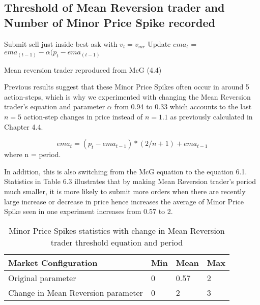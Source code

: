 \subsection{Threshold of Mean Reversion trader and Number of Minor Price Spike recorded}

\begin{algorithm}[H]
\DontPrintSemicolon 
{} {
     {
    Submit sell just inside best ask with $v_t = v_{mr}$\;
    }
    \EndIf
  }
\EndIf
Update $ema_t$ = $ema_{(t-1)} - \alpha(p_t - ema_{(t-1)}$
\caption{{\sc Mean reversion trader reproduced from McG (4.4) \cite{McGroarty}} }
\label{algo:max}
\end{algorithm}

Previous results suggest that these Minor Price Spikes often occur in around 5 action-steps, which is why we experimented with changing the Mean Reversion trader's equation and parameter $\alpha$ from 0.94 to 0.33 which accounts to the last $n = 5$ action-step changes in price instead of $n = 1.1$ as previously calculated in Chapter 4.4.

\begin{equation}
ema_t = (p_{t} - ema_{t-1}) * (2 / n + 1) + ema_{t-1} 
\end{equation}
where n = period.

In addition, this is also switching from the McG equation to the equation 6.1. Statistics in Table 6.3 illustrates that by making Mean Reversion trader's period much smaller, it is more likely to submit more orders when there are recently large increase or decrease in price hence increases the average of Minor Price Spike seen in one experiment increases from 0.57 to 2.  

\begin{table}[h]
\centering  
\begin{tabular}{ |m||p{2cm}|p{2cm}|p{2cm}|} 
\hline
\textbf{Market Configuration}& \textbf{ Min } & \textbf{ Mean } & \textbf{ Max}\\
\hline
\hline
Original parameter & 0 & 0.57 & 2 \\ 
\hline
Change in Mean Reversion parameter & 0 & 2 & 3 \\ 
\hline 
\hline
\end{tabular}
\caption{Minor Price Spikes statistics with change in Mean Reversion trader threshold equation and period}  
\end{table}
\FloatBarrier

